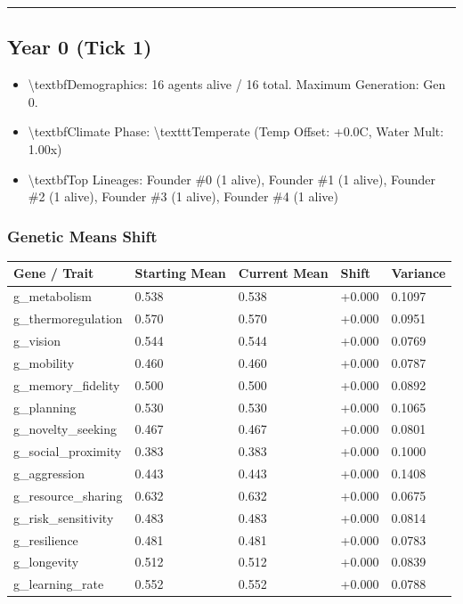 \documentclass[11pt,a4paper]{article}
\begin{document}
\noindent\rule{\textwidth}{0.4pt}

\subsection*{ Year 0 (Tick 1)}
\begin{itemize}
  \item \textbackslash{}textbf{Demographics:} 16 agents alive / 16 total. Maximum Generation: Gen 0.
  \item \textbackslash{}textbf{Climate Phase:} \textbackslash{}texttt{Temperate} (Temp Offset: +0.0C, Water Mult: 1.00x)
  \item \textbackslash{}textbf{Top Lineages:} Founder \#0 (1 alive), Founder \#1 (1 alive), Founder \#2 (1 alive), Founder \#3 (1 alive), Founder \#4 (1 alive)
\end{itemize}

\subsubsection*{ Genetic Means Shift}
\begin{longtable}{lllll}
\toprule
Gene / Trait & Starting Mean & Current Mean & Shift & Variance \\
\midrule
\endhead
g\_metabolism & 0.538 & 0.538 & +0.000 & 0.1097 \\
g\_thermoregulation & 0.570 & 0.570 & +0.000 & 0.0951 \\
g\_vision & 0.544 & 0.544 & +0.000 & 0.0769 \\
g\_mobility & 0.460 & 0.460 & +0.000 & 0.0787 \\
g\_memory\_fidelity & 0.500 & 0.500 & +0.000 & 0.0892 \\
g\_planning & 0.530 & 0.530 & +0.000 & 0.1065 \\
g\_novelty\_seeking & 0.467 & 0.467 & +0.000 & 0.0801 \\
g\_social\_proximity & 0.383 & 0.383 & +0.000 & 0.1000 \\
g\_aggression & 0.443 & 0.443 & +0.000 & 0.1408 \\
g\_resource\_sharing & 0.632 & 0.632 & +0.000 & 0.0675 \\
g\_risk\_sensitivity & 0.483 & 0.483 & +0.000 & 0.0814 \\
g\_resilience & 0.481 & 0.481 & +0.000 & 0.0783 \\
g\_longevity & 0.512 & 0.512 & +0.000 & 0.0839 \\
g\_learning\_rate & 0.552 & 0.552 & +0.000 & 0.0788 \\
\bottomrule
\end{longtable}
\end{document}
